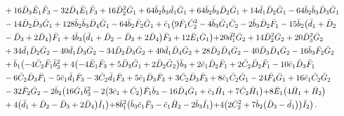 \documentclass[10pt]{amsart}
\theoremstyle{definition}
\theoremstyle{corollary}
\theoremstyle{remark}
\theoremstyle{conclusion}
\begin{document}
\begin{align}
& \hskip 0.7cm+16 \bar{D}_3 \bar{E}_1 \bar{F}_3-32 \bar{D}_4 \bar{E}_1 \bar{F}_3+16 \bar{D}_2^2 \bar{G}_1+64 \bar{b}_2 \bar{b}_3 \bar{d}_1 \bar{G}_1+64 \bar{b}_2 \bar{b}_3 \bar{D}_2 \bar{G}_1+14 \bar{d}_1 \bar{D}_2 \bar{G}_1-64 \bar{b}_2 \bar{b}_3 \bar{D}_3 \bar{G}_1\nonumber \\
& \hskip 0.7cm-14 \bar{D}_2 \bar{D}_3 \bar{G}_1+128 \bar{b}_2 \bar{b}_3 \bar{D}_4 \bar{G}_1-64 \bar{b}_2 \bar{F}_2 \bar{G}_1+\bar{c}_1 \bigl(9 \bar{F}_1 \bar{C}_2^2-4 \bar{b}_3 \bar{G}_1 \bar{C}_2-2 \bar{b}_3 \bar{D}_2 \bar{F}_1-15 \bar{b}_2 \bigl(\bar{d}_1+\bar{D}_2\nonumber \\
& \hskip 0.7cm-\bar{D}_3+2 \bar{D}_4\bigl) \bar{F}_1+4 \bar{b}_3 \bigl(\bar{d}_1+\bar{D}_2-\bar{D}_3+2 \bar{D}_4\bigl) \bar{F}_3+12 \bar{E}_1 \bar{G}_1\bigl)+20 \bar{d}_1^2 \bar{G}_2+14 \bar{D}_2^2 \bar{G}_2+20 \bar{D}_3^2 \bar{G}_2\nonumber \\
& \hskip 0.7cm+34 \bar{d}_1 \bar{D}_2 \bar{G}_2-40 \bar{d}_1 \bar{D}_3 \bar{G}_2-34 \bar{D}_2 \bar{D}_3 \bar{G}_2+40 \bar{d}_1 \bar{D}_4 \bar{G}_2+28 \bar{D}_2 \bar{D}_4 \bar{G}_2-40 \bar{D}_3 \bar{D}_4 \bar{G}_2-16 \bar{b}_3 \bar{F}_2 \bar{G}_2\nonumber \\
& \hskip 0.7cm+\bar{b}_1 \bigl(-4 \bar{C}_2 \bar{F}_1 \bar{b}_3^2+4 \bigl(-4 \bar{E}_1 \bar{F}_3+5 \bar{D}_3 \bar{G}_1+2 \bar{D}_2 \bar{G}_2\bigl) \bar{b}_3+2 \bar{c}_1 \bar{D}_2 \bar{F}_1+2 \bar{C}_2 \bar{D}_2 \bar{F}_1-10 \bar{c}_1\bar{D}_3 \bar{F}_1\nonumber \\
& \hskip 0.7cm-6 \bar{C}_2 \bar{D}_3 \bar{F}_1-5 \bar{c}_1 \bar{d}_1 \bar{F}_3-3 \bar{C}_2 \bar{d}_1 \bar{F}_3+5 \bar{c}_1 \bar{D}_3 \bar{F}_3+3 \bar{C}_2 \bar{D}_3 \bar{F}_3+8 \bar{c}_1 \bar{C}_2 \bar{G}_1-24 \bar{F}_4 \bar{G}_1+16 \bar{c}_1 \bar{C}_2 \bar{G}_2\nonumber \\
& \hskip 0.7cm-32 \bar{F}_2 \bar{G}_2-2 \bar{b}_2 \bigl(16 \bar{G}_1 \bar{b}_3^2-2 \bigl(3 \bar{c}_1+\bar{C}_2\bigl) \bar{F}_1 \bar{b}_3-16 \bar{D}_4 \bar{G}_1+\bar{c}_1 \bar{H}_1+7 \bar{C}_2 \bar{H}_1\bigl)+8 \bar{E}_1 \bigl(4 \bar{H}_1+\bar{H}_2\bigl)\nonumber \\
& \hskip 0.7cm+4 \bigl(\bar{d}_1+\bar{D}_2-\bar{D}_3+2 \bar{D}_4\bigl) \bar{I}_1\bigl)+8 \bar{b}_1^2 \bigl(\bar{b}_3 \bar{c}_1 \bar{F}_3-\bar{c}_1 \bar{H}_2-2 \bar{b}_3 \bar{I}_1\bigl)+4 \bigl(2 \bar{C}_2^2+7 \bar{b}_2 \bigl(\bar{D}_3-\bar{d}_1\bigl)\bigl) \bar{I}_2\bigl) \, . %
\end{align}
\end{document}
